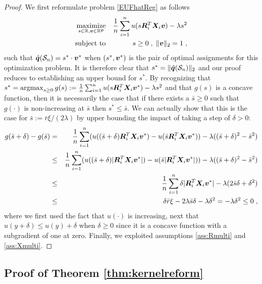 \documentclass[]{interact}
\theoremstyle{plain}%
\theoremstyle{definition}
\theoremstyle{remark}
\def\maximize{\mathop{\rm maximize}}
\def\subto{{\rm subject \mbox{   }\rm to}}
\def\argmax{\mathop{\rm argmax}}
\newcommand{\0}{\V{0}}
\newcommand{\1}{\V{1}}
\renewcommand{\Re}{\mathbb{R}}
\newcommand{\modified}[1]{{\color{blue} #1}}
\theoremstyle{plain}
\theoremstyle{definition}
\begin{document}
\begin{proof}
We first reformulate problem
  \eqref{EUFhatReg} as follows
  \begin{eqnarray*}
    \maximize_{s\in\Re,\vv\in\Re^\vp} && \frac{1}{n}\sum_{i=1}^n u(s \vR_i^T \vX_i \vv) - \lambda s^2\\
    \subto&& s\geq0\;,\;\|\vv\|_2=1\;,
  \end{eqnarray*}
 such that ${\hat{\boldsymbol{q}}}(\mathcal{S}_n) =s^*\cdot{\boldsymbol{v}}^*$ when $(s^*,{\boldsymbol{v}}^*)$ is the pair of optimal
  assignments for this optimization problem. It is therefore clear that
  $s^*=\|{\hat{\boldsymbol{q}}}(\mathcal{S}_n)\|_2$ and our proof reduces to establishing an upper bound for $s^*$.
  By recognizing that
  $s^*=\argmax_{s\geq 0} g(s):=\frac{1}{n}\sum_{i=1}^n u(s \vR_i^T \vX_i \vv^*) - \lambda s^2$
  and that $g(s)$ is a concave function, then it is necessarily the case that if there
  exists a $\bar{s}\geq 0$ such that $g(\cdot)$ is non-increasing at $\bar{s}$ then
  $s^* \leq \bar{s}$. We can actually show that this is the case for
  $\bar{s}:= \bar{r}\xi/(2\lambda)$ by upper bounding the impact of taking a step of
  $\delta>0$:
  \begin{eqnarray*}
    g(\bar{s}+\delta)-g(\bar{s}) &=& \frac{1}{n}\sum_{i=1}^n (u((\bar{s}+\delta) {\boldsymbol{R}}_i^T {\boldsymbol{X}}_i {\boldsymbol{v}}^*) - u(\bar{s} {\boldsymbol{R}}_i^T {\boldsymbol{X}}_i {\boldsymbol{v}}^*) ) - \lambda ((\bar{s}+\delta)^2-\bar{s}^2)\\
                                 &\leq& \frac{1}{n}\sum_{i=1}^n (u((\bar{s}+\delta) |{\boldsymbol{R}}_i^T{\boldsymbol{X}}_i {\boldsymbol{v}}^*|) - u(\bar{s} |{\boldsymbol{R}}_i^T{\boldsymbol{X}}_i {\boldsymbol{v}}^*|) ) - \lambda ((\bar{s}+\delta)^2-\bar{s}^2)\\
                                 &\leq & \frac{1}{n}\sum_{i=1}^n  \delta |{\boldsymbol{R}}_i^T {\boldsymbol{X}}_i {\boldsymbol{v}}^*| - \lambda (2\bar{s}\delta + \delta^2)\\
                                 &\leq &  \delta \bar{r} \xi  - 2\lambda \bar{s}\delta -  \lambda \delta^2 = -\lambda   \delta^2 \leq 0\;,
  \end{eqnarray*}
  where we first used the fact that $u(\cdot)$ is increasing, next that
  $u(y+\delta)\leq u(y)+\delta$ when $\delta\geq 0$ since it is a concave function with a
  subgradient of one at zero.  Finally, we exploited assumptions \ref{ass:Rmulti} and
  \ref{ass:Xmulti}. 
\end{proof}


\subsection{\modified{Proof of Theorem \ref{thm:kernelreform}}}
\end{document}

